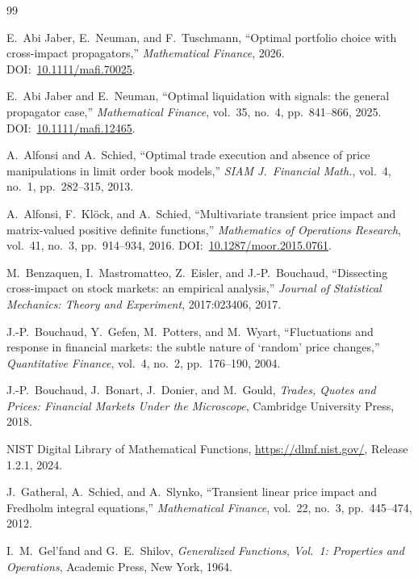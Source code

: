 \documentclass[12pt]{article}
\theoremstyle{definition}
\theoremstyle{remark}
\begin{document}
\begin{thebibliography}{99}

E.~Abi Jaber, E.~Neuman, and F.~Tuschmann,
``Optimal portfolio choice with cross-impact propagators,''
\emph{Mathematical Finance}, 2026.
DOI:~\href{https://doi.org/10.1111/mafi.70025}{10.1111/mafi.70025}.

E.~Abi Jaber and E.~Neuman,
``Optimal liquidation with signals: the general propagator case,''
\emph{Mathematical Finance}, vol.~35, no.~4, pp.~841--866, 2025.
DOI:~\href{https://doi.org/10.1111/mafi.12465}{10.1111/mafi.12465}.

A.~Alfonsi and A.~Schied,
``Optimal trade execution and absence of price manipulations in limit
  order book models,''
\emph{SIAM J.\ Financial Math.}, vol.~4, no.~1, pp.~282--315, 2013.

A.~Alfonsi, F.~Kl\"ock, and A.~Schied,
``Multivariate transient price impact and matrix-valued positive definite functions,''
\emph{Mathematics of Operations Research}, vol.~41, no.~3, pp.~914--934, 2016.
DOI:~\href{https://doi.org/10.1287/moor.2015.0761}{10.1287/moor.2015.0761}.

M.~Benzaquen, I.~Mastromatteo, Z.~Eisler, and J.-P.~Bouchaud,
``Dissecting cross-impact on stock markets: an empirical analysis,''
\emph{Journal of Statistical Mechanics: Theory and Experiment}, 2017:023406, 2017.

J.-P.~Bouchaud, Y.~Gefen, M.~Potters, and M.~Wyart,
``Fluctuations and response in financial markets: the subtle nature of `random' price changes,''
\emph{Quantitative Finance}, vol.~4, no.~2, pp.~176--190, 2004.

J.-P.~Bouchaud, J.~Bonart, J.~Donier, and M.~Gould,
\emph{Trades, Quotes and Prices: Financial Markets Under the Microscope},
Cambridge University Press, 2018.

NIST Digital Library of Mathematical Functions,
\url{https://dlmf.nist.gov/}, Release 1.2.1, 2024.

J.~Gatheral, A.~Schied, and A.~Slynko,
``Transient linear price impact and Fredholm integral equations,''
\emph{Mathematical Finance}, vol.~22, no.~3, pp.~445--474, 2012.

I.~M.~Gel'fand and G.~E.~Shilov,
\emph{Generalized Functions, Vol.~1: Properties and Operations},
Academic Press, New York, 1964.


\end{thebibliography}
\end{document}
